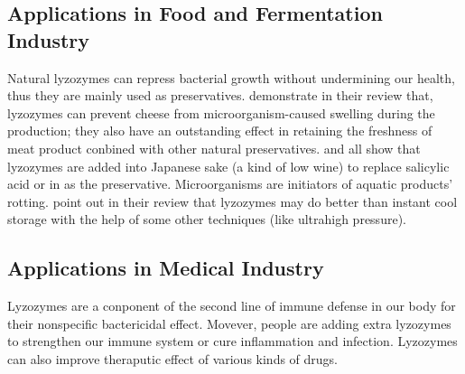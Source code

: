 \subsection{Applications in Food and Fermentation Industry}

Natural lyzozymes can repress bacterial growth without undermining our health, thus they are mainly used as preservatives. \citet{ZHAI2015} demonstrate in their review that, lyzozymes can prevent cheese from microorganism-caused swelling during the production; they also have an outstanding effect in retaining the freshness of meat product conbined with other natural preservatives.
\citet{Yu-tong2006} and \citet{ZHAI2015} all show that lyzozymes are added into Japanese sake (a kind of low wine) to replace salicylic acid or  in as the preservative. Microorganisms are initiators of aquatic products' rotting. \citet{Ren2013} point out in their review that lyzozymes may do better than instant cool storage with the help of some other techniques (like ultrahigh pressure).

\subsection{Applications in Medical Industry}
Lyzozymes are a conponent of the second line of immune defense in our body for their nonspecific bactericidal effect. Movever, people are adding extra lyzozymes to strengthen our immune system or cure inflammation and infection. Lyzozymes can also improve theraputic effect of various kinds of drugs. 

